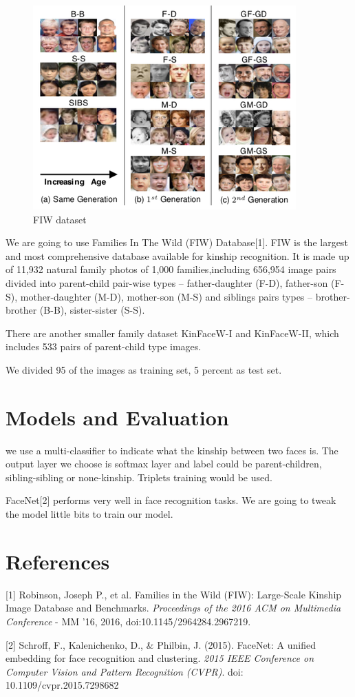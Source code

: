 \documentclass{article}
\begin{document}
\begin{figure}
\includegraphics[width=0.9\linewidth]{facepairs}
\caption{FIW dataset}
\label{fig:wrapfig}
\end{figure}

We are going to use Families In The Wild (FIW) Database[1]. FIW is the largest and
most comprehensive database available for kinship recognition. It is made up of
11,932 natural family photos of 1,000 families,including 656,954 image pairs
divided into parent-child pair-wise types -- father-daughter (F-D), father-son
(F-S), mother-daughter (M-D), mother-son (M-S) and siblings pairs types --
brother-brother (B-B), sister-sister (S-S).

There are another smaller family dataset KinFaceW-I and KinFaceW-II, which
includes 533 pairs of parent-child type images.

We divided 95 of the images as training set, 5 percent as test set.

\section{Models and Evaluation}
we use a multi-classifier to indicate what the kinship between two faces is. The
output layer we choose is softmax layer and label could be parent-children,
sibling-sibling or none-kinship.  Triplets training would be used.

FaceNet[2] performs very well in face recognition tasks. We are going to tweak the
model little bits to train our model.

\section*{References}
\medskip
\small
[1] Robinson, Joseph P., et al. Families in the Wild (FIW): Large-Scale Kinship
Image Database and Benchmarks. {\it Proceedings of the 2016 ACM on Multimedia
Conference} - MM '16, 2016, doi:10.1145/2964284.2967219.

[2] Schroff, F., Kalenichenko, D., \& Philbin, J. (2015). FaceNet: A unified
embedding for face recognition and clustering. {\it 2015 IEEE Conference on
Computer Vision and Pattern Recognition (CVPR)}. doi: 10.1109/cvpr.2015.7298682
\end{document}
